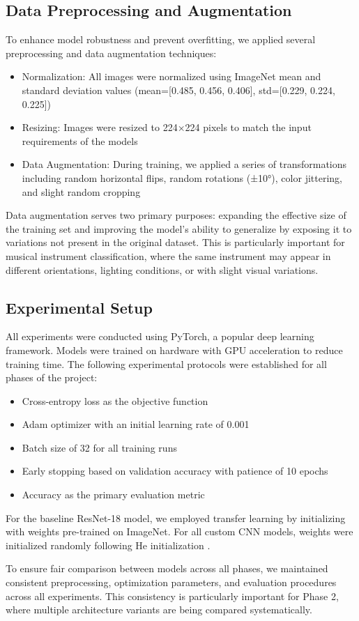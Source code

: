 \subsection{Data Preprocessing and Augmentation}
To enhance model robustness and prevent overfitting, we applied several preprocessing and data augmentation techniques:

\begin{itemize}
    \item Normalization: All images were normalized using ImageNet mean and standard deviation values (mean=[0.485, 0.456, 0.406], std=[0.229, 0.224, 0.225])
    \item Resizing: Images were resized to 224×224 pixels to match the input requirements of the models
    \item Data Augmentation: During training, we applied a series of transformations including random horizontal flips, random rotations (±10°), color jittering, and slight random cropping
\end{itemize}

Data augmentation serves two primary purposes: expanding the effective size of the training set and improving the model's ability to generalize by exposing it to variations not present in the original dataset. This is particularly important for musical instrument classification, where the same instrument may appear in different orientations, lighting conditions, or with slight visual variations.

\subsection{Experimental Setup}
All experiments were conducted using PyTorch, a popular deep learning framework. Models were trained on hardware with GPU acceleration to reduce training time. The following experimental protocols were established for all phases of the project:

\begin{itemize}
    \item Cross-entropy loss as the objective function
    \item Adam optimizer with an initial learning rate of 0.001
    \item Batch size of 32 for all training runs
    \item Early stopping based on validation accuracy with patience of 10 epochs
    \item Accuracy as the primary evaluation metric
\end{itemize}

For the baseline ResNet-18 model, we employed transfer learning by initializing with weights pre-trained on ImageNet. For all custom CNN models, weights were initialized randomly following He initialization \cite{he2015delving}.

To ensure fair comparison between models across all phases, we maintained consistent preprocessing, optimization parameters, and evaluation procedures across all experiments. This consistency is particularly important for Phase 2, where multiple architecture variants are being compared systematically.
